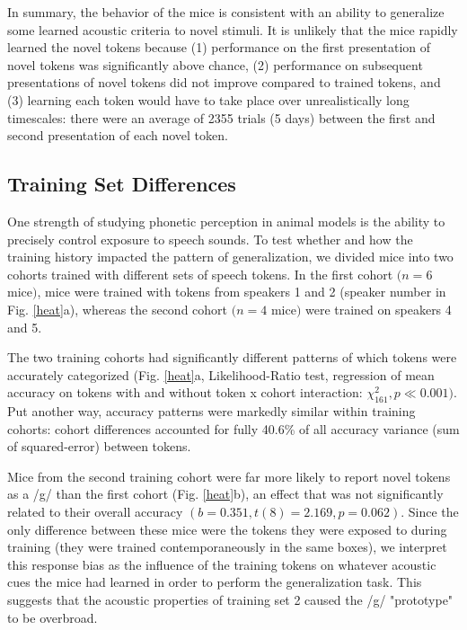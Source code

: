 In summary, the behavior of the mice is consistent with an ability to generalize some learned acoustic criteria to novel stimuli. It is unlikely that the mice rapidly learned the novel tokens because (1) performance on the first presentation of novel tokens was significantly above chance, (2) performance on subsequent presentations of novel tokens did not improve compared to trained tokens, and (3) learning each token would have to take place over unrealistically long timescales: there were an average of 2355 trials (5 days) between the first and second presentation of each novel token.

\subsection{Training Set Differences}

%
%
%
%
One strength of studying phonetic perception in animal models is the ability to precisely control exposure to speech sounds. To test whether and how the training history impacted the pattern of generalization, we divided mice into two cohorts trained with different sets of speech tokens. In the first cohort $ (n = 6$ mice$) $, mice were trained with tokens from speakers 1 and 2 (speaker number in Fig. \ref{heat}a), whereas the second cohort $ (n = 4$ mice$) $ were trained on speakers 4 and 5.

The two training cohorts had significantly different patterns of which tokens were accurately categorized (Fig. \ref{heat}a, Likelihood-Ratio test, regression of mean accuracy on tokens with and without token x cohort interaction: $\chi^2_{161}, p \ll 0.001)$. Put another way, accuracy patterns were markedly similar within training cohorts: cohort differences accounted for fully 40.6\% of all accuracy variance (sum of squared-error) between tokens.

Mice from the second training cohort were far more likely to report novel tokens as a /g/ than the first cohort (Fig. \ref{heat}b), an effect that was not significantly related to their overall accuracy $(b=0.351, t(8)=2.169, p=0.062 )$. Since the only difference between these mice were the tokens they were exposed to during training (they were trained contemporaneously in the same boxes),  we interpret this response bias as the influence of the training tokens on whatever acoustic cues the mice had learned in order to perform the generalization task. This suggests that the acoustic properties of training set 2 caused the /g/ "prototype" to be overbroad.

